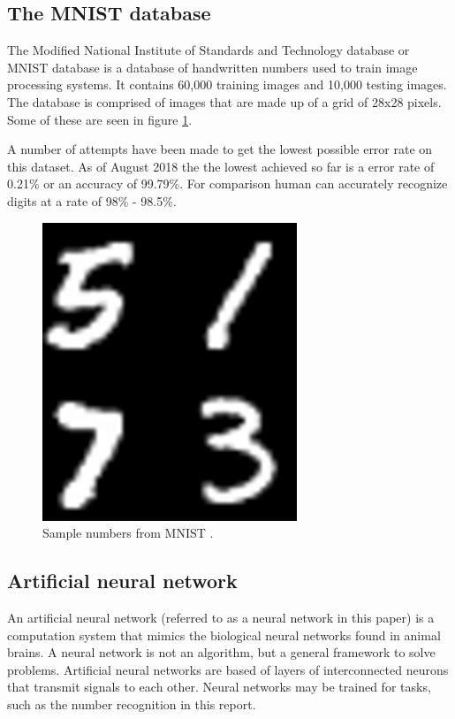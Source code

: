 \documentclass[12pt]{article}
\begin{document}
	

	\subsection{The MNIST database}
	The Modified National Institute of Standards and Technology database or MNIST database\cite{mnistDATABASE} is a database of handwritten numbers used to train image processing systems. It contains 60,000 training images and 10,000 testing images. The database is comprised of images that are made up of a grid of 28x28 pixels. Some of these are seen in figure \ref{fig:mathworksmnistneuralnetfinal}. \par 
	
	A number of attempts have been made to get the lowest possible error rate on this dataset. As of August 2018 the  the lowest achieved so far is a error rate of 0.21\% or an accuracy of 99.79\%. For comparison human can accurately recognize digits at a rate of 98\% - 98.5\%\cite{humanPerf}. 
	
	\begin{figure}[H]
		\centering
		\includegraphics[width=0.25\linewidth]{mathworks_mnist_neuralnetFinal_v2}
		\caption{Sample numbers from MNIST \cite{mnistMATLAB2}.}
		\label{fig:mathworksmnistneuralnetfinal}
	\end{figure}
	
	\subsection{Artificial neural network}
	An artificial neural network (referred to as a neural network in this paper) is a computation system that mimics the biological neural networks found in animal brains. A neural network is not an algorithm, but a general framework to solve problems. Artificial neural networks are based of layers of interconnected neurons that transmit signals to each other. Neural networks may be trained for tasks, such as the number recognition in this report. 
	
\end{document}
